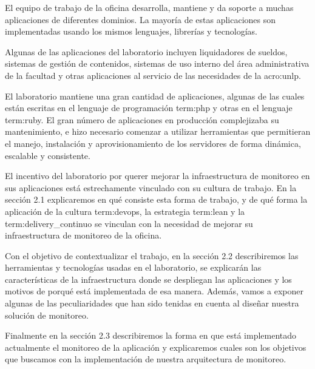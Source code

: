 El equipo de trabajo de la oficina desarrolla, mantiene y da soporte a muchas
aplicaciones de diferentes dominios. La mayoría de estas aplicaciones son
implementadas usando los mismos lenguajes, librerías y tecnologías.

Algunas de las aplicaciones del laboratorio incluyen liquidadores de sueldos,
sistemas de gestión de contenidos, sistemas de uso interno del área
administrativa de la facultad y otras aplicaciones al servicio de las
necesidades de la \gls{acro:unlp}.

El laboratorio mantiene una gran cantidad de aplicaciones, algunas de las
cuales están escritas en el lenguaje de programación \gls{term:php} y otras en
el lenguaje \gls{term:ruby}. El gran número de aplicaciones en producción
complejizaba su mantenimiento, e hizo necesario comenzar a utilizar
herramientas que permitieran el manejo, instalación y aprovisionamiento de los
servidores de forma dinámica, escalable y consistente.

El incentivo del laboratorio por querer mejorar la infraestructura de monitoreo
en sus aplicaciones está estrechamente vinculado con su cultura de trabajo. En
la sección 2.1 explicaremos en qué consiste esta forma de trabajo, y de qué
forma la aplicación de la cultura \gls{term:devops}, la estrategia
\gls{term:lean} y la \gls{term:delivery_continuo} se vinculan con la necesidad
de mejorar su infraestructura de monitoreo de la oficina.

Con el objetivo de contextualizar el trabajo, en la sección 2.2 describiremos
las herramientas y tecnologías usadas en el laboratorio, se explicarán las
características de la infraestructura donde se despliegan las aplicaciones y
los motivos de porqué está implementada de esa manera. Además, vamos a exponer
algunas de las peculiaridades que han sido tenidas en cuenta al diseñar nuestra
solución de monitoreo.

Finalmente en la sección 2.3 describiremos la forma en que está implementado
actualmente el monitoreo de la aplicación y explicaremos cuales son los
objetivos que buscamos con la implementación de nuestra arquitectura de
monitoreo.
